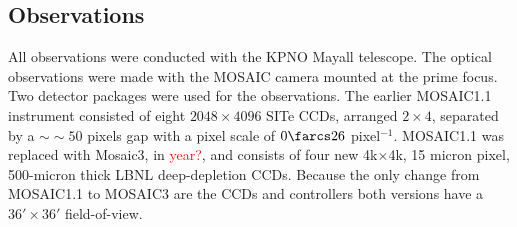 \documentclass[apj, revtex4-1]{emulateapj}
\newcommand{\editorial}[1]{\textcolor{red}{#1}}
\begin{document}


\subsection{Observations}\label{sec: observations}
All observations were conducted with the KPNO Mayall telescope. The optical observations were made with the MOSAIC camera mounted at the prime focus. Two detector packages were used for the observations. The earlier MOSAIC1.1 instrument consisted of eight $2048\times4096$ SITe CCDs, arranged $2\times4$, separated by a $∼\sim50$ pixels gap with a pixel scale of $0\farcs26$ pixel$^{-1}$. MOSAIC1.1 was replaced with Mosaic3, in \editorial{year?},  and consists of four new 4k$\times$4k, 15 micron pixel, 500-micron thick LBNL deep-depletion CCDs. Because the only change from MOSAIC1.1 to MOSAIC3 are the CCDs and controllers both versions have a $36' \times 36'$ field-of-view.
\end{document}
